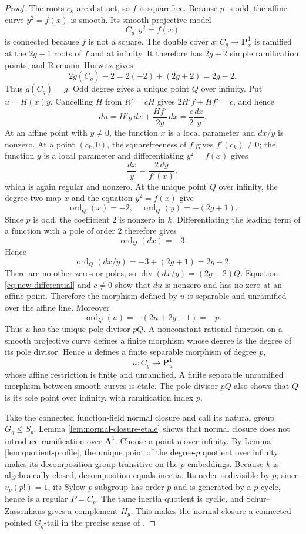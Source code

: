 \documentclass[11pt]{amsart}
\theoremstyle{plain}
\theoremstyle{definition}
\numberwithin{equation}{section}
\begin{document}
\begin{proof}
The roots $c_k$ are distinct, so $f$ is squarefree.  Because $p$ is odd, the
affine curve $y^2=f(x)$ is smooth.  Its smooth projective model
\[
 C_g:y^2=f(x)
\]
is connected because $f$ is not a square.  The double cover
$x:C_g\to\mathbf P^1_x$ is ramified at the $2g+1$ roots of $f$ and at
infinity.  It therefore has $2g+2$ simple ramification points, and
Riemann--Hurwitz gives
\[
 2g(C_g)-2=2(-2)+(2g+2)=2g-2.
\]
Thus $g(C_g)=g$.  Odd degree gives a unique point $Q$ over infinity.  Put
$u=H(x)y$.  Cancelling $H$ from $R'=cH$ gives
$2H'f+Hf'=c$, and hence
\[
 du=H'y\,dx+\frac{Hf'}{2y}\,dx
   =\frac{c}{2}\frac{dx}{y}.
 \label{eq:new-differential}
\]
At an affine point with $y\ne0$, the function $x$ is a local parameter and
$dx/y$ is nonzero.  At a point $(c_k,0)$, the squarefreeness of $f$ gives
$f'(c_k)\ne0$; the function $y$ is a local parameter and differentiating
$y^2=f(x)$ gives
\[
 \frac{dx}{y}=\frac{2\,dy}{f'(x)},
\]
which is again regular and nonzero.  At the unique point $Q$ over infinity,
the degree-two map $x$ and the equation $y^2=f(x)$ give
\[
 \operatorname{ord}_Q(x)=-2,\quad
 \operatorname{ord}_Q(y)=-(2g+1).
\]
Since $p$ is odd, the coefficient $2$ is nonzero in $k$.  Differentiating
the leading term of a function with a pole of order $2$ therefore gives
\[
 \operatorname{ord}_Q(dx)=-3.
\]
Hence
\[
 \operatorname{ord}_Q(dx/y)=-3+(2g+1)=2g-2.
\]
There are no other zeros or poles, so
$\operatorname{div}(dx/y)=(2g-2)Q$.  Equation
\eqref{eq:new-differential} and $c\ne0$ show that $du$ is nonzero and has no
zero at an affine point.  Therefore the morphism defined by $u$ is separable
and unramified over the affine line.  Moreover
\[
 \operatorname{ord}_Q(u)=-(2n+2g+1)=-p.
\]
Thus $u$ has the unique pole divisor $pQ$.  A nonconstant rational function
on a smooth projective curve defines a finite morphism whose degree is the
degree of its pole divisor.  Hence $u$ defines a finite separable morphism of
degree $p$,
\[
 u:C_g\longrightarrow\mathbf P^1_u
 \label{eq:new-map}
\]
whose affine restriction is finite and unramified.  A finite separable
unramified morphism between smooth curves is \'etale.  The pole divisor
$pQ$ also shows that $Q$ is its sole point over infinity, with ramification
index $p$.

Take the connected function-field normal closure and call its natural group
$G_g\leq S_p$.  Lemma \ref{lem:normal-closure-etale} shows that normal
closure does not introduce ramification over $\mathbf A^1$.  Choose a point
$\eta$ over infinity.  By Lemma \ref{lem:quotient-profile}, the unique point
of the degree-$p$ quotient over infinity makes its decomposition group
transitive on the $p$ embeddings.  Because $k$ is algebraically closed,
decomposition equals inertia.  Its order is divisible by $p$; since
$v_p(p!)=1$, its Sylow $p$-subgroup has order $p$ and is generated by a
$p$-cycle, hence is a regular $P=C_p$.  The tame inertia quotient is cyclic,
and Schur--Zassenhaus gives a complement $H_g$.  This makes the normal
closure a connected pointed
$G_g$-tail in the precise sense of
\cite[Definition 2.9]{WewersThree}.


\end{proof}
\end{document}
